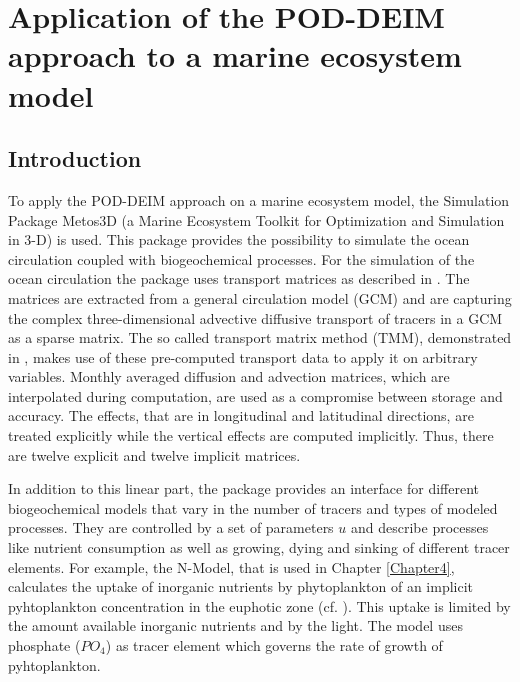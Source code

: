 
\chapter{Application of the POD-DEIM approach to a marine ecosystem model} %

\label{Chapter3} %


\section{Introduction}
To apply the POD-DEIM approach on a marine ecosystem model, the Simulation Package Metos3D (a Marine Ecosystem Toolkit for Optimization and
Simulation in 3-D) \cite{metos3dsimpack} is used. This package provides the possibility to simulate the ocean circulation coupled with biogeochemical processes. 
For the simulation of the ocean circulation the package uses transport matrices as described in \cite{Khatiwala2005}. 
The matrices are extracted from a general circulation model (GCM) and are capturing the complex three-dimensional
advective diffusive transport of tracers in a GCM as a sparse matrix. 
The so called transport matrix method (TMM), demonstrated in \cite{TMM}, makes use of these pre-computed transport data to apply it on arbitrary variables. 
Monthly averaged diffusion and advection matrices, which are interpolated during computation, are used as a compromise between storage and accuracy.
The effects, that are in longitudinal and latitudinal directions, are treated explicitly while the vertical effects are computed implicitly. 
Thus, there are twelve explicit and twelve implicit matrices.  

In addition to this linear part, the package provides an interface for different 
biogeochemical models that vary in the number of tracers and types of modeled processes.
They are controlled by a set of parameters $u$ and describe processes like nutrient consumption as well as growing, dying and sinking of different tracer elements.
For example, the N-Model, that is used in Chapter \ref{Chapter4}, calculates the uptake of inorganic nutrients by phytoplankton of an implicit pyhtoplankton concentration in the euphotic zone (cf. \cite{biomodels}). 
This uptake is limited by the amount available inorganic 
nutrients and by the light. The model uses phosphate ($PO_4$) as tracer element which governs the rate of growth of pyhtoplankton.  


